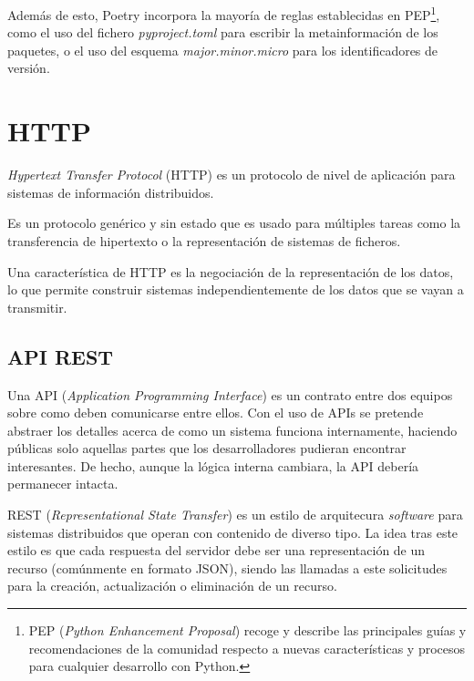 Además de esto, Poetry incorpora la mayoría de reglas establecidas en PEP\footnote{PEP (\emph{Python Enhancement Proposal}) recoge y describe las principales guías y recomendaciones de la comunidad respecto a nuevas características y procesos para cualquier desarrollo con Python.}, como el uso del fichero \emph{pyproject.toml} para escribir la metainformación de los paquetes, o el uso del esquema \emph{major.minor.micro} para los identificadores de versión. \emph{\parencite{Reference6}}


\section{HTTP}

\emph{Hypertext Transfer Protocol} (HTTP) es un protocolo de nivel de aplicación para sistemas de información distribuidos.

Es un protocolo genérico y sin estado que es usado para múltiples tareas como la transferencia de hipertexto o la representación de sistemas de ficheros.

Una característica de HTTP es la negociación de la representación de los datos, lo que permite construir sistemas independientemente de los datos que se vayan a transmitir. \emph{\parencite{Reference26}}

\subsection{API REST}

Una API (\emph{Application Programming Interface}) es un contrato entre dos equipos sobre como deben comunicarse entre ellos. Con el uso de APIs se pretende abstraer los detalles acerca de como un sistema funciona internamente, haciendo públicas solo aquellas partes que los desarrolladores pudieran encontrar interesantes. De hecho, aunque la lógica interna cambiara, la API debería permanecer intacta. \emph{\parencite{Reference27}}

REST (\emph{Representational State Transfer}) es un estilo de arquitecura \emph{software} para sistemas distribuidos que operan con contenido de diverso tipo. La idea tras este estilo es que cada respuesta del servidor debe ser una representación de un recurso (comúnmente en formato JSON), siendo las llamadas a este solicitudes para la creación, actualización o eliminación de un recurso. \emph{\parencite{Reference28}}


